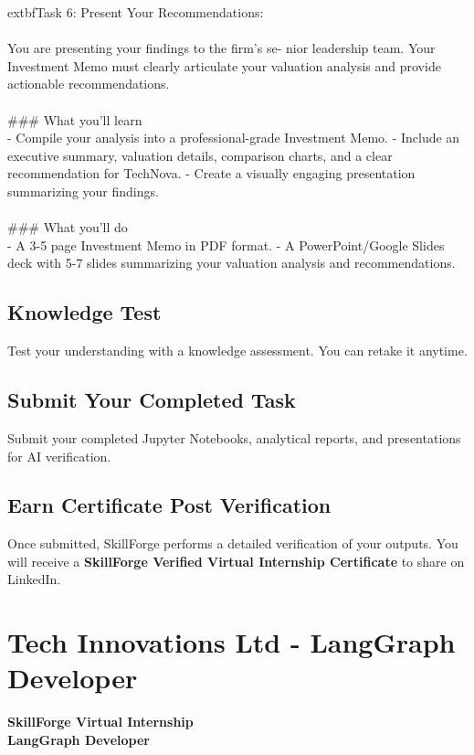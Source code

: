 \documentclass{article}
\begin{document}
	extbf{Task 6:} Present Your Recommendations:  \\
 \\
 You are presenting your findings to the firm’s se- nior leadership team. Your Investment Memo must clearly articulate your valuation analysis and provide actionable recommendations. \\
 \\
### What you'll learn \\
- Compile your analysis into a professional-grade Investment Memo. - Include an executive summary, valuation details, comparison charts, and a clear recommendation for TechNova. - Create a visually engaging presentation summarizing your findings. \\
 \\
### What you'll do \\
- A 3-5 page Investment Memo in PDF format. - A PowerPoint/Google Slides deck with 5-7 slides summarizing your valuation analysis and recommendations.

\subsection*{Knowledge Test}
Test your understanding with a knowledge assessment. You can retake it anytime.\\

\subsection*{Submit Your Completed Task}
Submit your completed Jupyter Notebooks, analytical reports, and presentations for AI verification.\\

\subsection*{Earn Certificate Post Verification}
Once submitted, SkillForge performs a detailed verification of your outputs. You will receive a \textbf{SkillForge Verified Virtual Internship Certificate} to share on LinkedIn.\\

\newpage

\section{Tech Innovations Ltd - LangGraph Developer}

\textbf{SkillForge Virtual Internship} \\
\textbf{LangGraph Developer} \\
\end{document}
